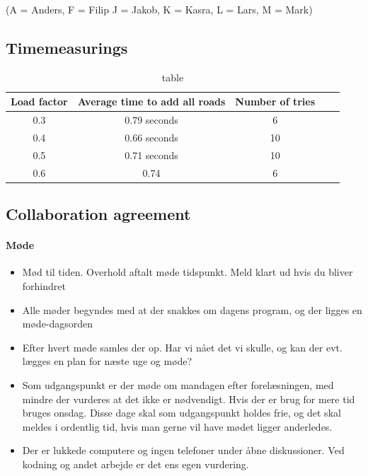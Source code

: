 \documentclass[a4paper,10pt,titlepage]{article}
\begin{document}
(A = Anders, F = Filip J = Jakob, K = Kasra, L = Lars, M = Mark)

	\newpage

	\subsection{Timemeasurings}
		\begin{table}[H]
		\caption{table}
		\centering
		\begin{tabular}{c c c c c}
Load factor & Average time to add all roads & Number of tries \\ [1.5ex] 
\hline
0.3 & 0.79 seconds & 6\\
0.4 & 0.66 seconds & 10 \\
0.5 & 0.71 seconds & 10 \\
0.6 & 0.74 & 6
\end{tabular}
\end{table}

	\newpage
	\subsection{Collaboration agreement}

\paragraph{M\o de} 
\begin{itemize}
\item Mød til tiden. Overhold aftalt møde tidspunkt. Meld klart ud hvis du bliver forhindret
\item Alle møder begyndes med at der snakkes om dagens program, og der ligges en møde-dagsorden
\item Efter hvert møde samles der op. Har vi nået det vi skulle, og kan der evt. lægges en plan for næste uge og møde?
\item Som udgangspunkt er der møde om mandagen efter forelæsningen, med mindre der vurderes at det ikke er nødvendigt. Hvis der er brug for mere tid bruges onsdag. Disse dage skal som udgangspunkt holdes frie, og det skal meldes i ordentlig tid, hvis man gerne vil have mødet ligger anderledes.
\item Der er lukkede computere og ingen telefoner under åbne diskussioner. Ved kodning og andet arbejde er det ens egen vurdering.
\end{itemize}
\end{document}
